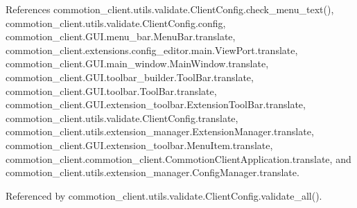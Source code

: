 References commotion\-\_\-client.\-utils.\-validate.\-Client\-Config.\-check\-\_\-menu\-\_\-text(), commotion\-\_\-client.\-utils.\-validate.\-Client\-Config.\-config, commotion\-\_\-client.\-G\-U\-I.\-menu\-\_\-bar.\-Menu\-Bar.\-translate, commotion\-\_\-client.\-extensions.\-config\-\_\-editor.\-main.\-View\-Port.\-translate, commotion\-\_\-client.\-G\-U\-I.\-main\-\_\-window.\-Main\-Window.\-translate, commotion\-\_\-client.\-G\-U\-I.\-toolbar\-\_\-builder.\-Tool\-Bar.\-translate, commotion\-\_\-client.\-G\-U\-I.\-toolbar.\-Tool\-Bar.\-translate, commotion\-\_\-client.\-G\-U\-I.\-extension\-\_\-toolbar.\-Extension\-Tool\-Bar.\-translate, commotion\-\_\-client.\-utils.\-validate.\-Client\-Config.\-translate, commotion\-\_\-client.\-utils.\-extension\-\_\-manager.\-Extension\-Manager.\-translate, commotion\-\_\-client.\-G\-U\-I.\-extension\-\_\-toolbar.\-Menu\-Item.\-translate, commotion\-\_\-client.\-commotion\-\_\-client.\-Commotion\-Client\-Application.\-translate, and commotion\-\_\-client.\-utils.\-extension\-\_\-manager.\-Config\-Manager.\-translate.



Referenced by commotion\-\_\-client.\-utils.\-validate.\-Client\-Config.\-validate\-\_\-all().


